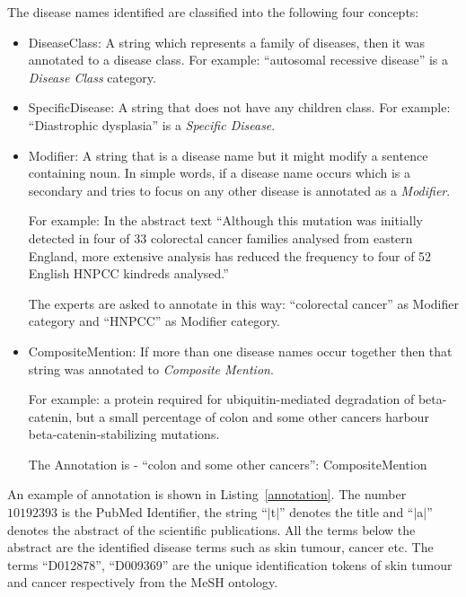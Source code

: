 The disease names identified are classified into the following four concepts: 
\begin{itemize}
    \item DiseaseClass: A string which represents a family of diseases, then it was annotated to a disease class. For example: ``autosomal recessive disease'' is a \emph{Disease Class} category.  
    
    \item SpecificDisease: A string that does not have any children class. For example: ``Diastrophic dysplasia'' is a \emph{Specific Disease}. 
    
    \item Modifier: A string that is a disease name but it might modify a sentence containing noun. In simple words, if a disease name occurs which is a secondary and tries to focus on any other disease is annotated as a \emph{Modifier}. 
    
    For example: In the abstract text ``Although this mutation was initially detected in four of 33 colorectal cancer families analysed from eastern England, more extensive analysis has reduced the frequency to four of 52 English HNPCC kindreds analysed.'' 
    
    The experts are asked to annotate in this way: ``colorectal cancer'' as Modifier category and ``HNPCC'' as Modifier category. 
    
    \item CompositeMention: If more than one disease names occur together then that string was annotated to \emph{Composite Mention}. 
    
    For example: a protein required for ubiquitin-mediated degradation of beta-catenin, but a small percentage of colon and some other cancers harbour beta-catenin-stabilizing mutations. 
    
    The Annotation is - ``colon and some other cancers'': CompositeMention
    
\end{itemize}
 An example of annotation is shown in Listing~\ref{annotation}. 
The number $10192393$ is the PubMed Identifier, the string ``$|$t$|$'' denotes the title and ``$|$a$|$'' denotes the abstract of the scientific publications. All the terms below the abstract are the identified disease terms such as skin tumour, cancer etc. The terms ``D012878'', ``D009369'' are the unique identification tokens of skin tumour and cancer respectively from the MeSH ontology. 

